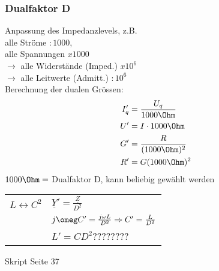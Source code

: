 \subsubsection{Dualfaktor D}
Anpassung des Impedanzlevels, z.B.\\
alle Ströme $:1000$,\\
alle Spannungen $x1000$\\
$\rightarrow$ alle Widerstände (Imped.) $x10^6$\\
$\rightarrow$ alle Leitwerte (Admitt.) $:10^6$\\
Berechnung der dualen Grössen:\\
\begin{align}
	I_q'&=\frac{U_q}{1000\Ohm}\nonumber\\
	U'&=I\cdot 1000\Ohm\nonumber\\
	G'&=\frac{R}{(1000\Ohm)^2}\nonumber\\
	R'&=G(1000\Ohm)^2\nonumber
\end{align}
$1000\Ohm=$ Dualfaktor D, kann beliebig gewählt werden\\
\begin{tabular}{ll}
	$L \leftrightarrow C^2$ & $\underline{Y}'=\frac{\underline{Z}}{D^2}$\\
	& $j\omeg C'=\frac{j\omega L}{D^2} \Rightarrow C'=\frac{L}{D^2}$\\
	& $L'=C D^2$????????
\end{tabular}
Skript Seite 37

